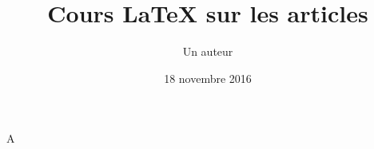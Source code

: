 \documentclass[francais, 10pt]{article}
\title{Cours LaTeX sur les articles}
\author{Un auteur}
\date{18 novembre 2016}
\begin{document}
A
\end{document}
